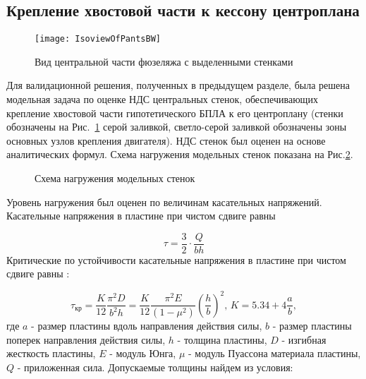  \subsection{Крепление хвостовой части к кессону центроплана} 
\label{sec:pants}
\begin{figure}[H]
\centering
\texttt{[image: IsoviewOfPantsBW]}
\caption{Вид центральной части фюзеляжа с выделенными стенками}
\label{fig:IsoviewOfPants}
\end{figure}


Для валидационной решения, полученных в предыдущем разделе, была решена модельная задача по оценке НДС центральных стенок, обеспечивающих крепление хвостовой части гипотетического БПЛА к его центроплану (стенки обозначены на Рис.~\ref{fig:IsoviewOfPants} серой заливкой, светло-серой заливкой обозначены зоны основных узлов крепления двигателя). НДС стенок был оценен на основе аналитических формул. Схема нагружения модельных стенок показана на Рис.\ref{fig:IsoviewOfPantsModel}.

\begin{figure}[H]
\centering

\caption{Схема нагружения модельных стенок}
\label{fig:IsoviewOfPantsModel}
\end{figure}

%


Уровень нагружения был оценен по величинам касательных напряжений. Касательные напряжения в пластине при чистом сдвиге равны

\begin{equation}
\tau=\frac{3}{2}\cdot\frac{Q}{bh}
\end{equation}
Критические по устойчивости касательные напряжения в пластине при чистом сдвиге равны \cite{Volmir}:

\begin{equation}
\tau_\text{кр}=\frac{K}{12}\frac{\pi^2D}{b^2h} = \frac{K}{12}\frac{\pi^2E}{(1-\mu^2)}\left(\frac{h}{b}\right)^2,\, K=5.34 + 4\frac{a}{b},
\end{equation}
где $a$ - размер пластины вдоль направления действия силы, $b$ - размер пластины поперек направления действия силы, $h$ - толщина пластины, $D$ - изгибная жесткость пластины, $E$ - модуль Юнга, $\mu$ - модуль Пуассона материала пластины, $Q$ - приложенная сила.
Допускаемые толщины найдем из условия:

